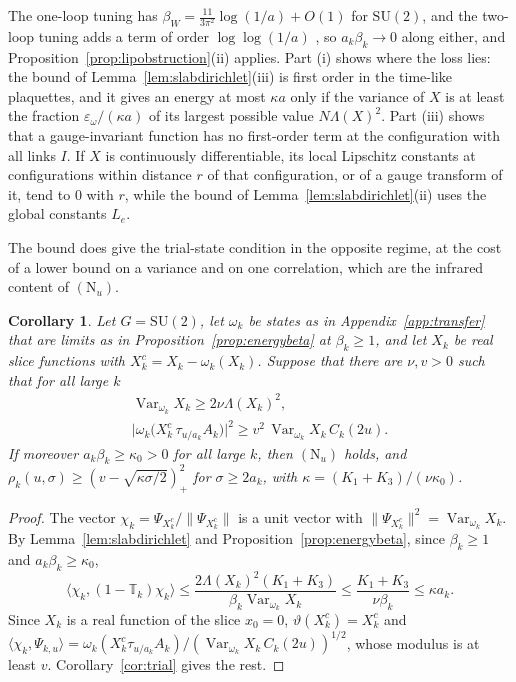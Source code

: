 \documentclass[aps,prd,twocolumn,superscriptaddress,nofootinbib,longbibliography,floatfix,amsmath,amssymb,10pt]{revtex4-2}
\newtheorem{corollary}[theorem]{Corollary}
\theoremstyle{definition}
\theoremstyle{remark}
\newcommand{\SU}{\mathrm{SU}}
\newcommand{\Var}{\operatorname{Var}}
\newcommand{\ip}[2]{\langle #1,#2\rangle}
\begin{document}
The one-loop tuning has $\beta_W=\frac{11}{3\pi^2}\log(1/a)+O(1)$ for $\SU(2)$, and the two-loop tuning adds a term of order $\log\log(1/a)$ \cite[Remark~247]{BBLR26}, so $a_k\beta_k\to0$ along either, and Proposition~\ref{prop:lipobstruction}(ii)
applies. Part (i) shows where the loss lies: the bound of
Lemma~\ref{lem:slabdirichlet}(iii) is first order in the time-like plaquettes,
and it gives an energy at most $\kappa a$ only if the variance of $X$ is at
least the fraction $\varepsilon_\omega/(\kappa a)$ of its largest possible
value $N\Lambda(X)^2$. Part (iii) shows that a gauge-invariant function has no
first-order term at the configuration with all links $I$. If $X$ is
continuously differentiable, its local Lipschitz constants at configurations
within distance $r$ of that configuration, or of a gauge transform of it, tend
to $0$ with $r$, while the bound of Lemma~\ref{lem:slabdirichlet}(ii) uses the
global constants $L_e$.

The bound does give the trial-state condition in the opposite regime, at the
cost of a lower bound on a variance and on one correlation, which are the
infrared content of $(\mathrm N_u)$.

\begin{corollary}\label{cor:lipreduction}
Let $G=\SU(2)$, let $\omega_k$ be states as in
Appendix~\textup{\ref{app:transfer}} that are limits as in
Proposition~\textup{\ref{prop:energybeta}} at $\beta_k\ge1$, and let $X_k$ be real
slice functions with $X_k^c=X_k-\omega_k(X_k)$. Suppose that there are
$\nu,v>0$ such that for all large $k$
\begin{gather*}
\Var_{\omega_k}X_k\ge2\nu\Lambda(X_k)^2,\\
\bigl|\omega_k\bigl(X_k^c\,\tau_{u/a_k}A_k\bigr)\bigr|^2\ge v^2\,\Var_{\omega_k}X_k\,
C_k(2u) .
\end{gather*}
If moreover $a_k\beta_k\ge\kappa_0>0$ for all large $k$, then $(\mathrm N_u)$
holds, and $\rho_k(u,\sigma)\ge(v-\sqrt{\kappa\sigma/2})_+^2$ for
$\sigma\ge2a_k$, with $\kappa=(K_1+K_3)/(\nu\kappa_0)$.
\end{corollary}

\begin{proof}
The vector $\chi_k=\Psi_{X_k^c}/\|\Psi_{X_k^c}\|$ is a unit vector with
$\|\Psi_{X_k^c}\|^2=\Var_{\omega_k}X_k$. By Lemma~\ref{lem:slabdirichlet} and
Proposition~\ref{prop:energybeta}, since $\beta_k\ge1$ and $a_k\beta_k\ge\kappa_0$,
\[
\ip{\chi_k}{(1-\mathbb T_k)\chi_k}\le\frac{2\Lambda(X_k)^2(K_1+K_3)}
{\beta_k\Var_{\omega_k}X_k}\le\frac{K_1+K_3}{\nu\beta_k}\le\kappa a_k .
\]
Since $X_k$ is a real function of the slice $x_0=0$, $\vartheta(X_k^c)=X_k^c$
and $\ip{\chi_k}{\Psi_{k,u}}=\omega_k(X_k^c\tau_{u/a_k}A_k)/(\Var_{\omega_k}
X_k\,C_k(2u))^{1/2}$, whose modulus is at least $v$. Corollary~\ref{cor:trial}
gives the rest.
\end{proof}
\end{document}
